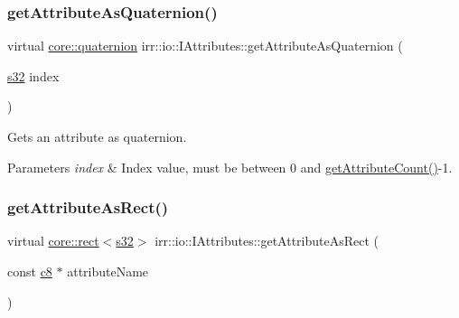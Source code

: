 \subsubsection{\texorpdfstring{get\+Attribute\+As\+Quaternion()}{getAttributeAsQuaternion()}\hspace{0.1cm}{\footnotesize\ttfamily [2/2]}}
{\footnotesize\ttfamily virtual \hyperlink{classirr_1_1core_1_1quaternion}{core\+::quaternion} irr\+::io\+::\+I\+Attributes\+::get\+Attribute\+As\+Quaternion (\begin{DoxyParamCaption}\item[{\hyperlink{namespaceirr_ac66849b7a6ed16e30ebede579f9b47c6}{s32}}]{index }\end{DoxyParamCaption})\hspace{0.3cm}{\ttfamily [pure virtual]}}



Gets an attribute as quaternion. 


\begin{DoxyParams}{Parameters}
{\em index} & Index value, must be between 0 and \hyperlink{classirr_1_1io_1_1IAttributes_a796bdd9440ee7ba0b6742a90a82870b6}{get\+Attribute\+Count()}-\/1. \\
\hline
\end{DoxyParams}
\mbox{\label{classirr_1_1io_1_1IAttributes_ac2d077105e2e7c263ea181f67a005cc2}} 
\subsubsection{\texorpdfstring{get\+Attribute\+As\+Rect()}{getAttributeAsRect()}\hspace{0.1cm}{\footnotesize\ttfamily [1/2]}}
{\footnotesize\ttfamily virtual \hyperlink{classirr_1_1core_1_1rect}{core\+::rect}$<$\hyperlink{namespaceirr_ac66849b7a6ed16e30ebede579f9b47c6}{s32}$>$ irr\+::io\+::\+I\+Attributes\+::get\+Attribute\+As\+Rect (\begin{DoxyParamCaption}\item[{const \hyperlink{namespaceirr_a9395eaea339bcb546b319e9c96bf7410}{c8} $\ast$}]{attribute\+Name }\end{DoxyParamCaption})\hspace{0.3cm}{\ttfamily [pure virtual]}}



